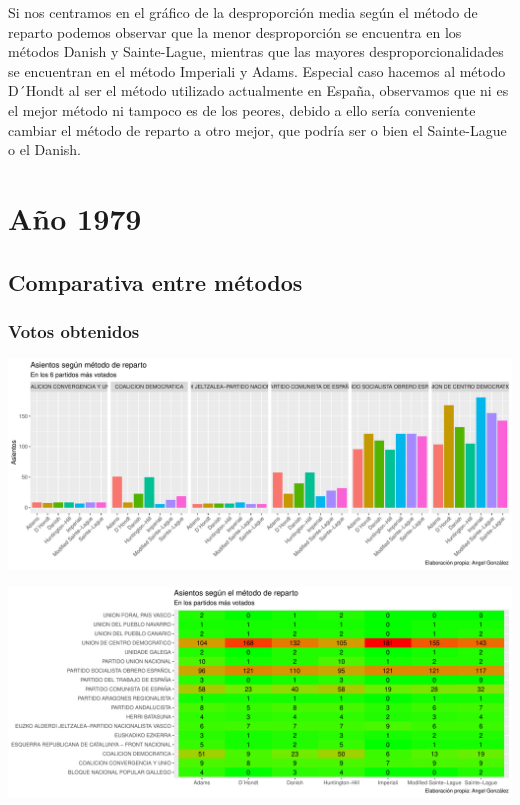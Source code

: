 \documentclass[12pt,a4paper,]{book}
\numberwithin{dummy}{section}
\theoremstyle{ocrenumbox}
\theoremstyle{blacknumex}
\theoremstyle{blacknumbox}
\theoremstyle{ocrenum}
\theoremstyle{ocrenum}
\begin{document}
Si nos centramos en el gráfico de la desproporción media según el método
de reparto podemos observar que la menor desproporción se encuentra en
los métodos Danish y Sainte-Lague, mientras que las mayores
desproporcionalidades se encuentran en el método Imperiali y Adams.
Especial caso hacemos al método D´Hondt al ser el método utilizado
actualmente en España, observamos que ni es el mejor método ni tampoco
es de los peores, debido a ello sería conveniente cambiar el método de
reparto a otro mejor, que podría ser o bien el Sainte-Lague o el Danish.

\hypertarget{auxf1o-1979}{%
\section{Año 1979}\label{auxf1o-1979}}

\hypertarget{comparativa-entre-muxe9todos-1}{%
\subsection{Comparativa entre
métodos}\label{comparativa-entre-muxe9todos-1}}

\hypertarget{votos-obtenidos-1}{%
\subsubsection{Votos obtenidos}\label{votos-obtenidos-1}}

\begin{center}\includegraphics[width=0.95\linewidth]{figurasR/unnamed-chunk-68-1} \end{center}

\begin{center}\includegraphics[width=0.95\linewidth]{figurasR/unnamed-chunk-68-2} \end{center}
\end{document}
